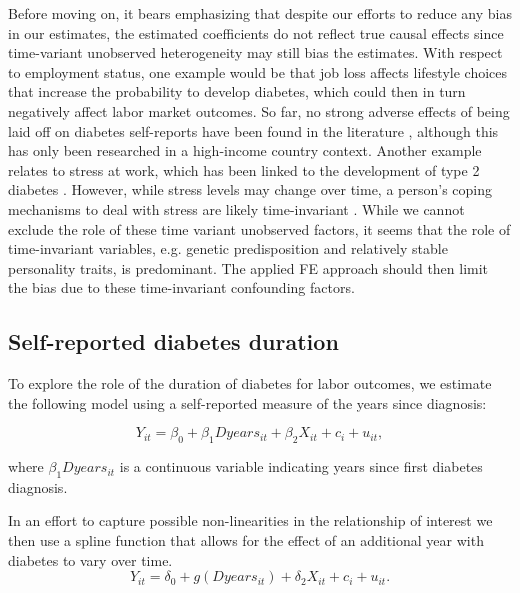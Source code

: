 \documentclass[12pt,english]{article}
\begin{document}
Before moving on, it bears emphasizing that despite our efforts to reduce any bias in our estimates, the estimated coefficients do not reflect true causal effects since time-variant unobserved heterogeneity may still bias the estimates. With respect to employment status, one example would be that job loss affects lifestyle choices that increase the probability to develop diabetes, which could then in turn negatively affect labor market outcomes. So far, no strong adverse effects of being laid off on diabetes self-reports have been found in the literature \parencite{Bergemann2011,Schaller2015}, although this has only been researched in a high-income country context. Another example relates to stress at work, which has been linked to the development of type 2 diabetes \parencite{Heraclides2012,Eriksson2013}. However, while stress levels may change over time, a person's coping mechanisms to deal with stress are likely time-invariant \textcite{Schneiderman2005}. While we cannot exclude the role of these time variant unobserved factors, it seems that the role of time-invariant variables, e.g. genetic predisposition and relatively stable personality traits, is predominant. The applied \ac{FE} approach should then limit the bias due to these time-invariant confounding factors. 


\subsection{Self-reported diabetes duration}
To explore the role of the duration of diabetes for labor outcomes, we estimate the following model using a self-reported
measure of the years since diagnosis:


\begin{equation}
Y_{it}=\beta_{0}+\beta_{1}Dyears_{it}+\beta_{2}X_{it}+c_{i}+u_{it},\label{eq:duration_linear}
\end{equation}


\noindent where $\beta_{1}Dyears_{it}$ is a continuous variable indicating years since first diabetes diagnosis.

In an effort to capture possible non-linearities in the relationship of interest we then use a spline function that allows for the effect of an additional year with diabetes to vary over time.
\begin{equation}
Y_{it}=\delta_{0}+g(Dyears_{it})+\delta_{2}X_{it}+c_{i}+u_{it}.\label{eq:splines}
\end{equation}
\end{document}
